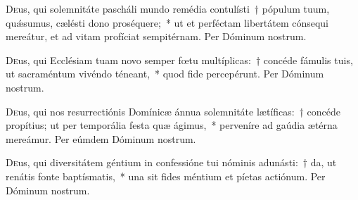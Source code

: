 \documentclass[vesperale_romanum.tex]{subfiles}
\begin{document}





\oratio

\lettrine{D}{e}us, qui sole\-mnitáte pascháli mundo remédia contulísti~† pópulum tuum, quǽsumus, cælésti dono proséquere;~* ut et perféctam libertátem cónsequi mereátur, et ad vitam profíciat sempitérnam. Per Dóminum nostrum.



\oratio

\lettrine{D}{e}us, qui Ecclésiam tuam novo semper fœtu multíplicas:~† concéde fámulis tuis, ut sacraméntum vivéndo téneant,~* quod fide percepérunt.
Per Dóminum nostrum.



\oratio

\lettrine{D}{e}us, qui nos resurrectiónis Domínicæ ánnua sole\-mnitáte lætíficas:~† concéde propítius; ut per temporália festa quæ ágimus,~* perveníre ad gaúdia ætérna mereámur.
Per eúmdem Dóminum nostrum.





\oratio

\lettrine{D}{e}us, qui diversitátem géntium in confessióne tui nóminis adunásti:~† da, ut renátis fonte baptísmatis,~* una sit fides méntium et píetas actiónum.
Per Dóminum nostrum.
\end{document}
